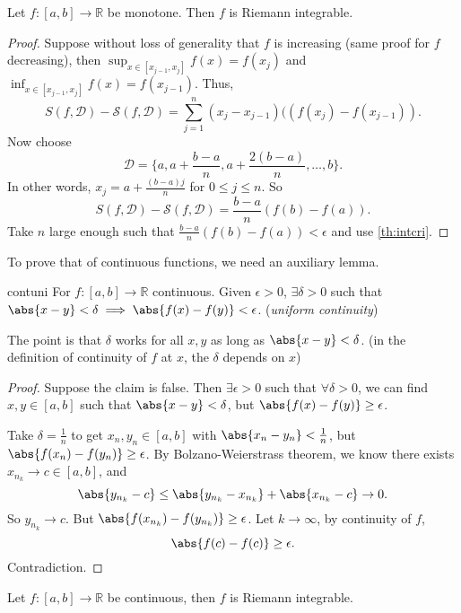 \begin{theorem}{}{}
    Let \(f: [a,b] \to \mathbb{R}\) be monotone. Then \(f\) is Riemann integrable.
\end{theorem}
\begin{proof}
    Suppose without loss of generality that \(f\) is increasing (same proof for \(f\) decreasing), then \(\sup_{x\in[x_{j-1},x_j]}f(x) = f(x_j)\) and \(\inf_{x\in[x_{j-1},x_j]}f(x) = f(x_{j-1})\). Thus,
    \[
        S(f,\mathcal{D}) - \mathscr{S}(f,\mathcal{D}) = \sum_{j=1}^{n} (x_j - x_{j-1})((f(x_j) - f(x_{j-1})).
    \]
    Now choose
    \[
        \mathcal{D} = \{a, a + \frac{b-a}{n}, a + \frac{2(b-a)}{n} , \dots, b\}.
    \]
    In other words, \(x_j = a + \frac{(b-a)j}{n}\) for \(0 \leq j \leq n\). So
    \[
        S(f, \mathcal{D}) - \mathscr{S}(f, \mathcal{D}) = \frac{b-a}{n}(f(b) - f(a)).
    \]
    Take \(n\) large enough such that \(\frac{b-a}{n}(f(b) - f(a))<\epsilon\) and use \cref{th:intcri}.
\end{proof}
To prove that of continuous functions, we need an auxiliary lemma.
\begin{lemma}{}{contuni}
    For \(f: [a,b] \to \mathbb{R}\) continuous. Given \(\epsilon > 0\), \(\exists \delta> 0\) such that \(\abs{x-y}<\delta \implies \abs{f(x) - f(y)}<\epsilon\). (\textit{uniform continuity})
\end{lemma}
The point is that \(\delta\) works for all \(x, y\) as long as \(\abs{x-y}<\delta\). (in the definition of continuity of \(f\) at \(x\), the \(\delta\) depends on \(x\))
\begin{proof}
    Suppose the claim is false. Then \(\exists \epsilon>0\) such that \(\forall \delta > 0\), we can find \(x, y \in [a,b]\) such that \(\abs{x-y} < \delta\), but \(\abs{f(x) - f(y)} \geq \epsilon\).

    Take \(\delta = \frac{1}{n}\) to get \(x_n, y_n \in [a,b]\) with \(\abs{x_n - y_n} < \frac{1}{n}\), but \(\abs{f(x_n) - f(y_n)} \geq \epsilon\). By Bolzano-Weierstrass theorem, we know there exists \(x_{n_k} \to c \in [a,b]\), and
    \[
        \abs{y_{n_k} - c} \leq \abs{y_{n_k} - x_{n_k}} + \abs{x_{n_k} - c} \to 0.
    \]
    So \(y_{n_k} \to c\). But \(\abs{f(x_{n_k}) - f(y_{n_k})} \geq \epsilon\). Let \(k \to \infty\), by continuity of \(f\),
    \[
        \abs{f(c) - f(c)} \geq \epsilon.
    \]
    Contradiction.
\end{proof}
\begin{theorem}
    Let \(f: [a,b] \to \mathbb{R}\) be continuous, then \(f\) is Riemann integrable.
\end{theorem}
